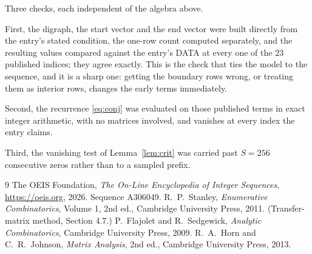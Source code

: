 \documentclass[11pt,a4paper]{article}
\theoremstyle{plain}
\theoremstyle{definition}
\begin{document}
Three checks, each independent of the algebra above.

First, the digraph, the start vector and the end vector were built directly from the
entry's stated condition, the one-row count computed separately, and the resulting values
compared against the entry's DATA at every one of the $23$ published indices; they
agree exactly. This is the check that ties the model to the sequence, and it is a sharp one:
getting the boundary rows wrong, or treating them as interior rows, changes the early terms
immediately.

Second, the recurrence \eqref{eq:conj} was evaluated on those published terms in exact
integer arithmetic, with no matrices involved, and vanishes at every index the entry claims.

Third, the vanishing test of Lemma~\ref{lem:crit} was carried past $S=256$ consecutive
zeros rather than to a sampled prefix.

\begin{thebibliography}{9}
 The OEIS Foundation, \emph{The On-Line Encyclopedia of Integer
Sequences}, \url{https://oeis.org}, 2026. Sequence A306049.
 R.~P.~Stanley, \emph{Enumerative Combinatorics}, Volume 1, 2nd ed.,
Cambridge University Press, 2011. (Transfer-matrix method, Section 4.7.)
 P.~Flajolet and R.~Sedgewick, \emph{Analytic Combinatorics}, Cambridge
University Press, 2009.
 R.~A.~Horn and C.~R.~Johnson, \emph{Matrix Analysis}, 2nd ed., Cambridge
University Press, 2013.
\end{thebibliography}
\end{document}
